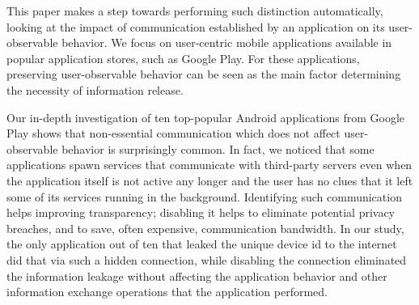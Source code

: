 
This paper makes a step towards performing such distinction automatically, looking at the impact of communication established by an application on its user-observable behavior. 
We focus on user-centric mobile applications available in popular application stores, such as Google Play. 
For these applications, preserving user-observable behavior can be seen as the main factor determining the necessity of information release. 

Our in-depth investigation of ten top-popular Android applications from Google Play shows that non-essential communication which does not affect user-observable behavior is surprisingly common.
In fact, we noticed that some applications spawn services that communicate with third-party servers even when the application itself is not active any longer and the user has no clues that it left some of its services running in the background. 
Identifying such communication helps improving transparency; disabling it helps to eliminate potential privacy breaches, and to save, often expensive, communication bandwidth. 
In our study, the only application out of ten that leaked the unique device id to the internet did that via such a hidden connection, while 
disabling the connection eliminated the information leakage without affecting the application behavior and other information exchange operations that the application performed.



